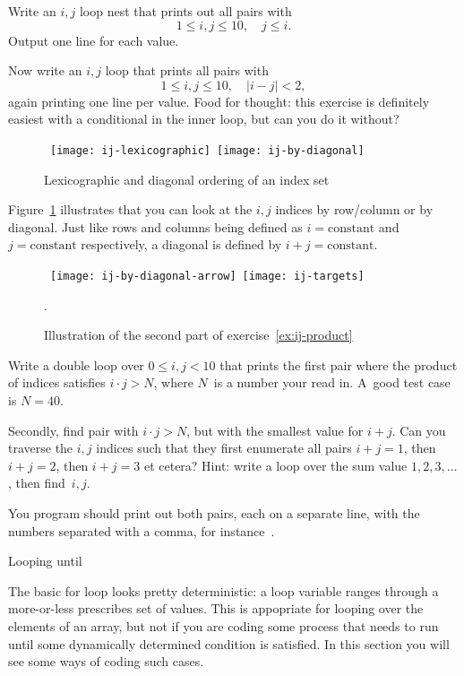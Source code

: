 \begin{exercise}
  \label{ex:ij-triangle}
  Write an $i,j$ loop nest that prints out all pairs with
  \[ 1\leq i,j\leq 10,\quad  j\leq i. \]
  Output one line for each  value.

  Now write an $i,j$ loop that prints all pairs with
  \[ 1\leq i,j\leq 10,\quad |i-j|<2, \]
  again printing one line per  value.
  Food for thought: this exercise is definitely easiest with a
  conditional in the inner loop, but can you do
  it without? 
\end{exercise}

\begin{figure}[ht]
  \hbox{%
    \texttt{[image: ij-lexicographic]}
    \texttt{[image: ij-by-diagonal]}
    }
  \caption{Lexicographic and diagonal ordering of an index set}  
  \label{fig:ij-lex}
\end{figure}

Figure~\ref{fig:ij-lex} illustrates that you can look at the $i,j$
indices by row/column or by diagonal. Just like rows and columns being
defined as $i=\mathrm{constant}$ and $j=\mathrm{constant}$
respectively,
a diagonal is defined by $i+j=\mathrm{constant}$.

\begin{figure}[ht]
  \hbox{%
    \texttt{[image: ij-by-diagonal-arrow]}
    \texttt{[image: ij-targets]}
    }
  \caption{Illustration of the second part of exercise~\ref{ex:ij-product}}.
  \label{fig:ij-min}
\end{figure}

\begin{exercise}
  \label{ex:ij-product}
  Write a double loop over $0\leq i,j<10$ that prints the first pair
  where the product of indices satisfies $i\cdot j> N$, where $N$~is a
  number your read in. A~good test case is $N=40$.

  Secondly, find pair with $i\cdot j>N$, but with the smallest value for $i+j$.
  Can you traverse the $i,j$ indices such that they first enumerate
  all pairs $i+j=1$, then $i+j=2$, then $i+j=3$ et cetera? Hint:
  write a loop over the sum value $1,2,3,\ldots$, then find~$i,j$.

  You program should print out both pairs, each on a separate line,
  with the numbers separated with a comma, for instance~.
\end{exercise}

 {Looping until}
\label{sec:loopuntil}

The basic for loop looks pretty deterministic: a loop variable ranges
through a more-or-less prescribes set of values. This is appopriate
for looping over the elements of an array, but not if you are coding
some process that needs to run until some dynamically determined
condition is satisfied. In this section you will see some ways of
coding such cases.

